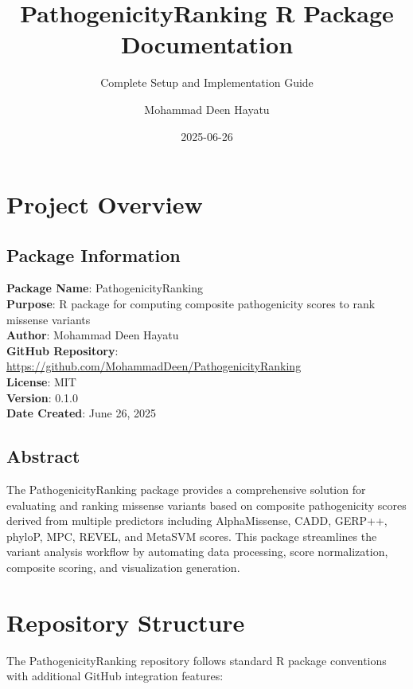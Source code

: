 \documentclass[
  11pt,
]{article}
\title{PathogenicityRanking R Package Documentation}
\subtitle{Complete Setup and Implementation Guide}
\author{Mohammad Deen Hayatu}
\date{2025-06-26}
\begin{document}
\maketitle

{
\setcounter{tocdepth}{3}
\tableofcontents
}
\newpage

\section{Project Overview}\label{project-overview}

\subsection{Package Information}\label{package-information}

\textbf{Package Name}: PathogenicityRanking\\
\textbf{Purpose}: R package for computing composite pathogenicity scores
to rank missense variants\\
\textbf{Author}: Mohammad Deen Hayatu\\
\textbf{GitHub Repository}:
\url{https://github.com/MohammadDeen/PathogenicityRanking}\\
\textbf{License}: MIT\\
\textbf{Version}: 0.1.0\\
\textbf{Date Created}: June 26, 2025

\subsection{Abstract}\label{abstract}

The PathogenicityRanking package provides a comprehensive solution for
evaluating and ranking missense variants based on composite
pathogenicity scores derived from multiple predictors including
AlphaMissense, CADD, GERP++, phyloP, MPC, REVEL, and MetaSVM scores.
This package streamlines the variant analysis workflow by automating
data processing, score normalization, composite scoring, and
visualization generation.

\newpage

\section{Repository Structure}\label{repository-structure}

The PathogenicityRanking repository follows standard R package
conventions with additional GitHub integration features:
\end{document}
